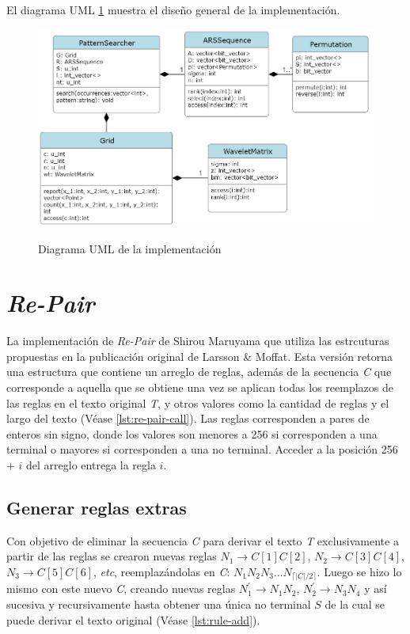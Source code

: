 El diagrama UML \ref{fig:uml} muestra el diseño general de la implementación.

\begin{figure}[h!]
    \centering
    \captionsetup{position=above} %
    \caption{Diagrama UML de la implementación}
    \includegraphics[width=1\textwidth]{imagenes/UML.png} %
    \label{fig:uml}
\end{figure}



\section{\textit{Re-Pair}}

La implementación de \textit{Re-Pair} de Shirou Maruyama\cite{re-pair} que utiliza las estrcuturas propuestas en la publicación original de Larsson \& Moffat\cite{Larsson2000}. Esta versión retorna una estructura que contiene un arreglo de reglas, además de la secuencia \textit{C} que corresponde a aquella que se obtiene una vez se aplican todas los reemplazos de las reglas en el texto original \textit{T}, y otros valores como la cantidad de reglas y el largo del texto (Véase \ref{lst:re-pair-call}). Las reglas corresponden a pares de enteros sin signo, donde los valores son menores a 256 si corresponden a una terminal o mayores si corresponden a una no terminal. Acceder a la posición 256 + $i$ del arreglo entrega la regla $i$.

\subsection{Generar reglas extras}
\label{sect:extrar}
Con objetivo de eliminar la secuencia \textit{C} para derivar el texto \textit{T} exclusivamente a partir de las reglas se crearon nuevas reglas $N_1 \rightarrow C[1] C[2]$, $N_2 \rightarrow C[3] C[4]$, $N_3 \rightarrow C[5] C[6]$, \textit{etc}, reemplazándolas en \textit{C}: $ N_1 N_2 N_3 ... N_{\lceil | C | /2 \rceil}$. Luego se hizo lo mismo con este nuevo \textit{C}, creando nuevas reglas $N^{'}_1 \rightarrow N_1 N_2$, $N^{'}_2 \rightarrow N_3 N_4$ y así sucesiva y recursivamente hasta obtener una única no terminal $S$ de la cual se puede derivar el texto original (Véase \ref{lst:rule-add}).

